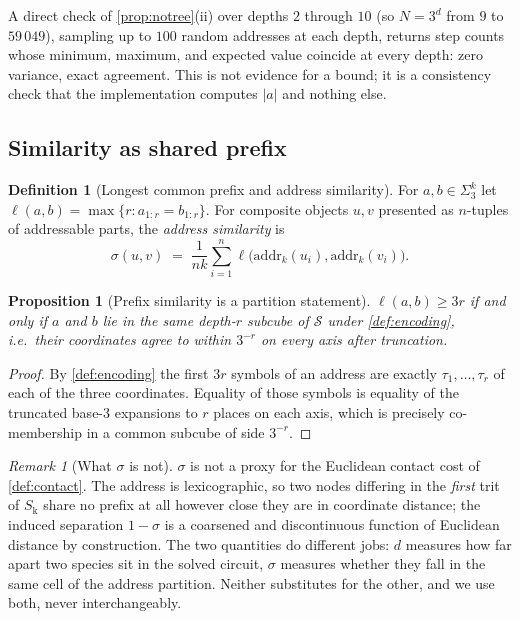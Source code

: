 \documentclass[11pt,twocolumn,a4paper]{article}
\theoremstyle{plain}
\newtheorem{proposition}[theorem]{Proposition}
\theoremstyle{definition}
\newtheorem{definition}[theorem]{Definition}
\theoremstyle{remark}
\newtheorem{remark}[theorem]{Remark}
\newcommand{\Sspace}{\mathcal{S}}
\newcommand{\Sk}{S_{\mathrm{k}}}
\newcommand{\addr}{\mathrm{addr}}
\newcommand{\lcp}{\ell}
\newcommand{\Trits}{\Sigma_3}
\begin{document}
A direct check of \cref{prop:notree}(ii) over depths $2$ through $10$
(so $N = 3^d$ from $9$ to $59\,049$), sampling up to $100$ random addresses at
each depth, returns step counts whose minimum, maximum, and expected value
coincide at every depth: zero variance, exact agreement. This is not evidence
for a bound; it is a consistency check that the implementation computes
$|a|$ and nothing else.

\subsection{Similarity as shared prefix}

\begin{definition}[Longest common prefix and address similarity]
\label{def:similar}
For $a,b \in \Trits^{k}$ let $\lcp(a,b) = \max\{r : a_{1:r} = b_{1:r}\}$. For
composite objects $u,v$ presented as $n$-tuples of addressable parts, the
\emph{address similarity} is
\begin{equation}
\sigma(u,v) \;=\; \frac{1}{nk}\sum_{i=1}^{n} \lcp\bigl(\addr_k(u_i),\addr_k(v_i)\bigr) .
\label{eq:sigma}
\end{equation}
\end{definition}

\begin{proposition}[Prefix similarity is a partition statement]
\label{prop:sigma-partition}
$\lcp(a,b) \ge 3r$ if and only if $a$ and $b$ lie in the same depth-$r$ subcube
of $\Sspace$ under \cref{def:encoding}, i.e.\ their coordinates agree to
within $3^{-r}$ on every axis after truncation.
\end{proposition}

\begin{proof}
By \cref{def:encoding} the first $3r$ symbols of an address are exactly
$\tau_1,\dots,\tau_r$ of each of the three coordinates. Equality of those
symbols is equality of the truncated base-3 expansions to $r$ places on each
axis, which is precisely co-membership in a common subcube of side $3^{-r}$.
\end{proof}

\begin{remark}[What $\sigma$ is not]
\label{rem:sigma-not-metric}
$\sigma$ is not a proxy for the Euclidean contact cost of \cref{def:contact}.
The address is lexicographic, so two nodes differing in the \emph{first} trit of
$\Sk$ share no prefix at all however close they are in coordinate distance; the
induced separation $1 - \sigma$ is a coarsened and discontinuous function of
Euclidean distance by construction. The two quantities do different jobs:
$d$ measures how far apart two species sit in the solved circuit, $\sigma$
measures whether they fall in the same cell of the address partition. Neither
substitutes for the other, and we use both, never interchangeably.
\end{remark}
\end{document}
